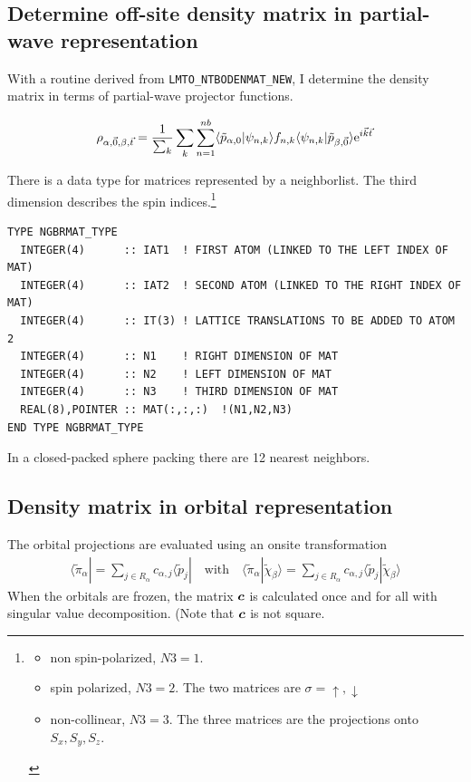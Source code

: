 \documentclass[11pt,a4paper]{report}
\begin{document}
\subsection{Determine off-site density matrix in partial-wave representation}
With a routine derived from \verb|LMTO_NTBODENMAT_NEW|, I determine
the density matrix in terms of partial-wave projector functions.

\begin{eqnarray}
\rho_{\alpha,\vec{0},\beta,\vec{t}}
=\frac{1}{\sum_k}\sum_k\sum_{n=1}^{nb}
\langle\tilde{p}_{\alpha,0}|\psi_{n,k}\rangle f_{n,k}
\langle\psi_{n,k}|\tilde{p}_{\beta,\vec{0}}\rangle\mathrm{e}^{i\vec{k}\vec{t}}
\end{eqnarray}

There is a data type for matrices represented by a neighborlist.
The third dimension describes the spin indices.\footnote{
\begin{itemize}
\item non spin-polarized, $N3=1$.
\item spin polarized, $N3=2$. The two matrices are $\sigma=\uparrow,\downarrow$
\item non-collinear, $N3=3$. The three matrices are the projections
  onto $S_x,S_y,S_z$.
\end{itemize}
} 
\begin{verbatim}
TYPE NGBRMAT_TYPE
  INTEGER(4)      :: IAT1  ! FIRST ATOM (LINKED TO THE LEFT INDEX OF MAT)
  INTEGER(4)      :: IAT2  ! SECOND ATOM (LINKED TO THE RIGHT INDEX OF MAT)
  INTEGER(4)      :: IT(3) ! LATTICE TRANSLATIONS TO BE ADDED TO ATOM 2
  INTEGER(4)      :: N1    ! RIGHT DIMENSION OF MAT
  INTEGER(4)      :: N2    ! LEFT DIMENSION OF MAT
  INTEGER(4)      :: N3    ! THIRD DIMENSION OF MAT
  REAL(8),POINTER :: MAT(:,:,:)  !(N1,N2,N3)
END TYPE NGBRMAT_TYPE
\end{verbatim}
In a closed-packed sphere packing there are 12 nearest neighbors.

\subsection{Density matrix in orbital representation}
The orbital projections are evaluated using an onsite transformation
\begin{eqnarray}
\langle\tilde{\pi}_\alpha|=\sum_{j\in R_\alpha} c_{\alpha,j}\langle\tilde{p}_j|
\quad\text{with}\quad
\langle\tilde{\pi}_\alpha|\tilde{\chi}_\beta\rangle
=\sum_{j\in R_\alpha} c_{\alpha,j}\langle\tilde{p}_j|\tilde{\chi}_\beta\rangle
\end{eqnarray}
When the orbitals are frozen, the matrix $\bm{c}$ is calculated once
and for all with singular value decomposition. (Note that $\bm{c}$ is
not square.
\end{document}
